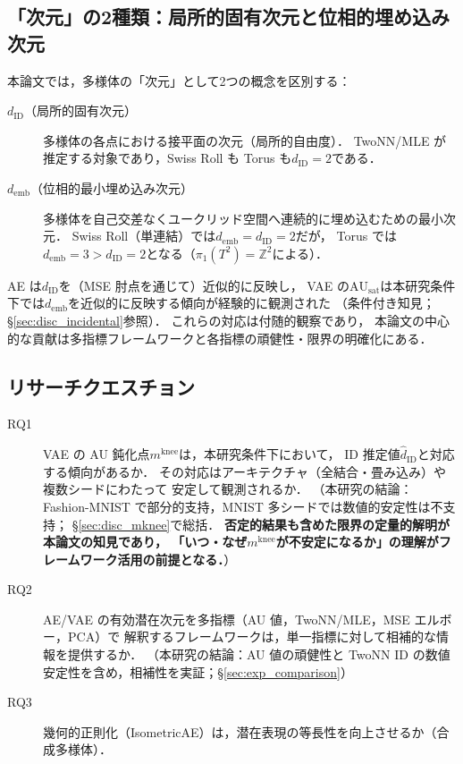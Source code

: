 \documentclass[11pt,a4paper]{jsarticle}
\newcommand{\dID}{d_{\mathrm{ID}}}
\newcommand{\AUsat}{\mathrm{AU}_{\mathrm{sat}}}
\newcommand{\mknee}{m^{\mathrm{knee}}}
\newcommand{\demb}{d_{\mathrm{emb}}}
\begin{document}
\subsection{「次元」の2種類：局所的固有次元と位相的埋め込み次元}\label{sec:intro_dim}

本論文では，多様体の「次元」として2つの概念を区別する：

\begin{description}
  \item[$\dID$（局所的固有次元）]
        多様体の各点における接平面の次元（局所的自由度）．
        TwoNN/MLE が推定する対象であり，Swiss Roll も Torus も$\dID = 2$である．
  \item[$\demb$（位相的最小埋め込み次元）]
        多様体を自己交差なくユークリッド空間へ連続的に埋め込むための最小次元．
        Swiss Roll（単連結）では$\demb = \dID = 2$だが，
        Torus では$\demb = 3 > \dID = 2$となる（$\pi_1(T^2) = \mathbb{Z}^2$による）．
\end{description}

AE は$\dID$を（MSE 肘点を通じて）近似的に反映し，
VAE の$\AUsat$は本研究条件下では$\demb$を近似的に反映する傾向が経験的に観測された
（条件付き知見；§\ref{sec:disc_incidental}参照）．
これらの対応は付随的観察であり，
本論文の中心的な貢献は多指標フレームワークと各指標の頑健性・限界の明確化にある．

\subsection{リサーチクエスチョン}\label{sec:intro_rq}

\begin{description}
  \item[RQ1] VAE の AU 鈍化点$\mknee$は，本研究条件下において，
             ID 推定値$\hat{d}_\mathrm{ID}$と対応する傾向があるか．
             その対応はアーキテクチャ（全結合・畳み込み）や複数シードにわたって
             安定して観測されるか．
             （本研究の結論：Fashion-MNIST で部分的支持，MNIST 多シードでは数値的安定性は不支持；
             §\ref{sec:disc_mknee}で総括．
             \textbf{否定的結果も含めた限界の定量的解明が本論文の知見であり，
             「いつ・なぜ$\mknee$が不安定になるか」の理解がフレームワーク活用の前提となる．}）
  \item[RQ2] AE/VAE の有効潜在次元を多指標（AU 値，TwoNN/MLE，MSE エルボー，PCA）で
             解釈するフレームワークは，単一指標に対して相補的な情報を提供するか．
             （本研究の結論：AU 値の頑健性と TwoNN ID の数値安定性を含め，相補性を実証；§\ref{sec:exp_comparison}）
  \item[RQ3] 幾何的正則化（IsometricAE）は，潜在表現の等長性を向上させるか（合成多様体）．
\end{description}
\end{document}
